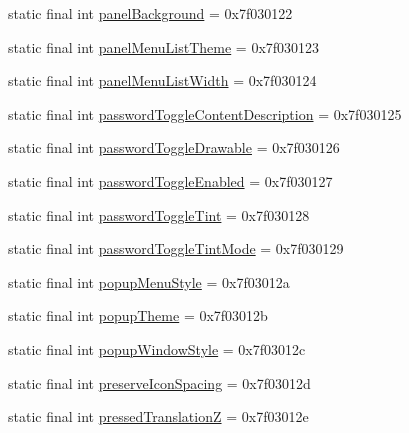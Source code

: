 \begin{DoxyCompactItemize}
static final int \mbox{\hyperlink{classandroid_1_1support_1_1design_1_1_r_1_1attr_a1825b20d558d4aaaa7919f1bc0a86a0f}{panel\+Background}} = 0x7f030122
\item 
static final int \mbox{\hyperlink{classandroid_1_1support_1_1design_1_1_r_1_1attr_a9d1da2a3d76d5b857f71129133e00747}{panel\+Menu\+List\+Theme}} = 0x7f030123
\item 
static final int \mbox{\hyperlink{classandroid_1_1support_1_1design_1_1_r_1_1attr_ab1e61ad48f90eadf6d64bb466f5d2a83}{panel\+Menu\+List\+Width}} = 0x7f030124
\item 
static final int \mbox{\hyperlink{classandroid_1_1support_1_1design_1_1_r_1_1attr_ab86ef5f16fb45e852004797f85c9d962}{password\+Toggle\+Content\+Description}} = 0x7f030125
\item 
static final int \mbox{\hyperlink{classandroid_1_1support_1_1design_1_1_r_1_1attr_ad34751d242f81fd15023ea0c9098b41b}{password\+Toggle\+Drawable}} = 0x7f030126
\item 
static final int \mbox{\hyperlink{classandroid_1_1support_1_1design_1_1_r_1_1attr_a4ceee1c320b22ad02f77a85e0ccc11d6}{password\+Toggle\+Enabled}} = 0x7f030127
\item 
static final int \mbox{\hyperlink{classandroid_1_1support_1_1design_1_1_r_1_1attr_aa16735a90d99a10e9b107a62d47899c3}{password\+Toggle\+Tint}} = 0x7f030128
\item 
static final int \mbox{\hyperlink{classandroid_1_1support_1_1design_1_1_r_1_1attr_adc4fadcdc73f67a83d221e68549b5d6b}{password\+Toggle\+Tint\+Mode}} = 0x7f030129
\item 
static final int \mbox{\hyperlink{classandroid_1_1support_1_1design_1_1_r_1_1attr_ab8c4bcc320670a9a91d34689dd5613e6}{popup\+Menu\+Style}} = 0x7f03012a
\item 
static final int \mbox{\hyperlink{classandroid_1_1support_1_1design_1_1_r_1_1attr_a0fa86fecf0709d268738146b4e2bae6a}{popup\+Theme}} = 0x7f03012b
\item 
static final int \mbox{\hyperlink{classandroid_1_1support_1_1design_1_1_r_1_1attr_a9fd9d37846cc33aa761d2e36a682d82d}{popup\+Window\+Style}} = 0x7f03012c
\item 
static final int \mbox{\hyperlink{classandroid_1_1support_1_1design_1_1_r_1_1attr_aa46bd1c2da48c73b677e7c879334e44a}{preserve\+Icon\+Spacing}} = 0x7f03012d
\item 
static final int \mbox{\hyperlink{classandroid_1_1support_1_1design_1_1_r_1_1attr_af8a71cbe4f9675d0ccb188419119d859}{pressed\+TranslationZ}} = 0x7f03012e
\item 

\end{DoxyCompactItemize}

